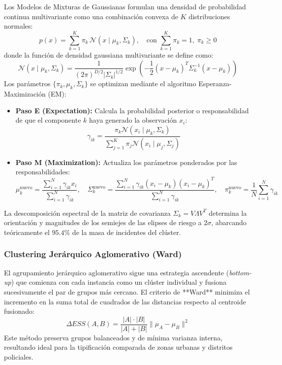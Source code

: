 Los Modelos de Mixturas de Gaussianas formulan una densidad de probabilidad continua multivariante como una combinación convexa de $K$ distribuciones normales:
\begin{equation}
    p(x) = \sum_{k=1}^K \pi_k \, \mathcal{N}(x \mid \mu_k, \Sigma_k), \quad \text{con } \sum_{k=1}^K \pi_k = 1, \; \pi_k \ge 0
\end{equation}
donde la función de densidad gaussiana multivariante se define como:
\begin{equation}
    \mathcal{N}(x \mid \mu_k, \Sigma_k) = \frac{1}{(2\pi)^{D/2} |\Sigma_k|^{1/2}} \exp\left(-\frac{1}{2} (x-\mu_k)^T \Sigma_k^{-1} (x-\mu_k)\right)
\end{equation}
Los parámetros $\{\pi_k, \mu_k, \Sigma_k\}$ se optimizan mediante el algoritmo Esperanza-Maximización (EM):
\begin{itemize}
    \item \textbf{Paso E (Expectation):} Calcula la probabilidad posterior o responsabilidad de que el componente $k$ haya generado la observación $x_i$:
    \begin{equation}
        \gamma_{ik} = \frac{\pi_k \mathcal{N}(x_i \mid \mu_k, \Sigma_k)}{\sum_{j=1}^K \pi_j \mathcal{N}(x_i \mid \mu_j, \Sigma_j)}
    \end{equation}
    \item \textbf{Paso M (Maximization):} Actualiza los parámetros ponderados por las responsabilidades:
    \begin{equation}
        \mu_k^{\text{nuevo}} = \frac{\sum_{i=1}^N \gamma_{ik} x_i}{\sum_{i=1}^N \gamma_{ik}}, \quad \Sigma_k^{\text{nuevo}} = \frac{\sum_{i=1}^N \gamma_{ik} (x_i - \mu_k)(x_i - \mu_k)^T}{\sum_{i=1}^N \gamma_{ik}}, \quad \pi_k^{\text{nuevo}} = \frac{1}{N} \sum_{i=1}^N \gamma_{ik}
    \end{equation}
\end{itemize}
La descomposición espectral de la matriz de covarianza $\Sigma_k = V \Lambda V^T$ determina la orientación y magnitudes de los semiejes de las elipses de riesgo a $2\sigma$, abarcando teóricamente el $95.4\%$ de la masa de incidentes del clúster.

\subsubsection{Clustering Jerárquico Aglomerativo (Ward)}

El agrupamiento jerárquico aglomerativo sigue una estrategia ascendente (\textit{bottom-up}) que comienza con cada instancia como un clúster individual y fusiona sucesivamente el par de grupos más cercano. El criterio de **Ward** minimiza el incremento en la suma total de cuadrados de las distancias respecto al centroide fusionado:
\begin{equation}
    \Delta ESS(A, B) = \frac{|A| \cdot |B|}{|A| + |B|} \| \mu_A - \mu_B \|^2
\end{equation}
Este método preserva grupos balanceados y de mínima varianza interna, resultando ideal para la tipificación comparada de zonas urbanas y distritos policiales.

